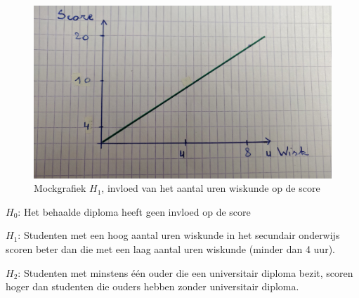 \documentclass{hogent-article}
\begin{document}
	\begin{figure}[H]
	 	\includegraphics[width=\linewidth]{img/imgg1.jpg}
 		\caption{Mockgrafiek \textbf{$H_1$}, invloed van het aantal uren wiskunde op de score}
	\end{figure}
	 
	\textbf{$H_0$}: Het behaalde diploma heeft geen invloed op de score
	
	\textbf{$H_1$}: Studenten met een hoog aantal uren wiskunde in het secundair onderwijs scoren beter dan die met een laag aantal uren wiskunde (minder dan 4 uur).
	
	\textbf{$H_2$}: Studenten met minstens één ouder die een universitair diploma bezit, scoren hoger dan studenten die ouders hebben zonder universitair diploma.
\end{document}

